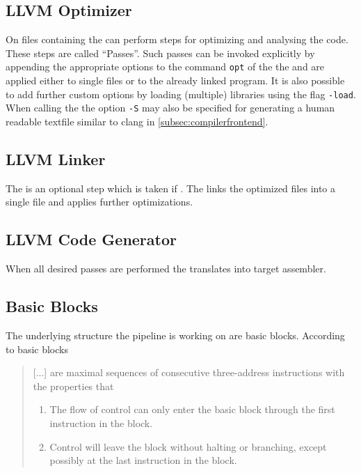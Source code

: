 \subsection{LLVM Optimizer}\label{subsec:optimizer}
On files containing \llvmir the \opt can perform steps for optimizing and analysing the code.
These steps are called \enquote{Passes}.
Such passes can be invoked explicitly by appending the appropriate options to the command \texttt{opt} of the the \opt and are applied either to single files or to the already linked program.
It is also possible to add further custom options by loading (multiple) libraries using the flag \texttt{-load}.
When calling the \opt the option \texttt{-S} may also be specified for generating a human readable textfile similar to clang in \autoref{subsec:compilerfrontend}.
\subsection{LLVM Linker}
The \linker is an optional step which is taken if .
The \linker links the optimized \llvmir files into a single \llvmir file and applies further optimizations.
\subsection{LLVM Code Generator}
When all desired passes are performed the \generator translates \llvmir into target assembler.
\subsection{Basic Blocks}
The underlying structure the pipeline is working on are basic blocks.
According to \cite[chapter 8.4, p.~525]{Drachenbuch} basic blocks

\begin{quote}
    [...] are maximal sequences of consecutive three-address instructions with the properties that
    \begin{enumerate}[label=(\alph*)]
        \item The flow of control can only enter the basic block through the first instruction in the block.
        \item Control will leave the block without halting or branching, except possibly at the last instruction in the block.
    \end{enumerate}
\end{quote}
